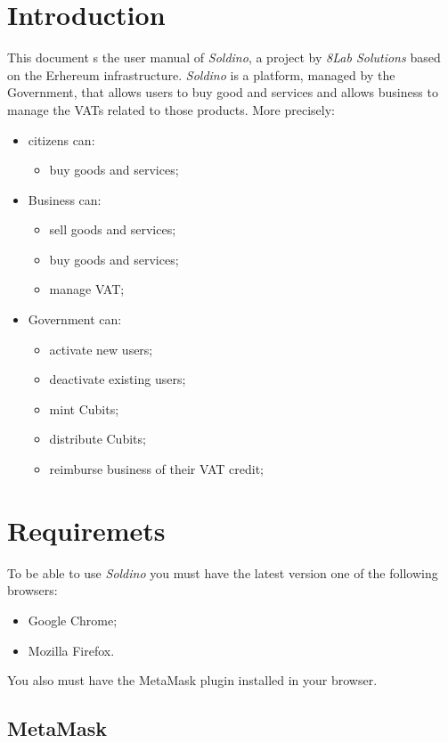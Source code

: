 \section{Introduction} 
	This document s the user manual of \textit{Soldino}, a project by 
	\textit{8Lab Solutions} based on the Erhereum infrastructure. 
	\textit{Soldino} is a platform, managed by the Government, that allows 
	users to buy good and services and allows business to manage the VATs 
	related to those products.
	More precisely:
	\begin{itemize}
		\item citizens can:
		\begin{itemize}
			\item  buy goods and services;
		\end{itemize}
		\item Business can:
		\begin{itemize}
			\item sell goods and services;
			\item buy goods and services;
			\item manage VAT;
		\end{itemize}
		\item Government can:
		\begin{itemize}
			\item activate new users;
			\item deactivate existing users;
			\item mint Cubits;
			\item distribute Cubits;
			\item reimburse business of their VAT credit;
		\end{itemize}
	\end{itemize}

\section{Requiremets}
	To be able to use \textit{Soldino} you must have the latest version one 
	of the following browsers:
	\begin{itemize}
		\item Google Chrome;
		\item Mozilla Firefox.
	\end{itemize}
	You also must have the MetaMask plugin installed in your browser.
\subsection{MetaMask}
